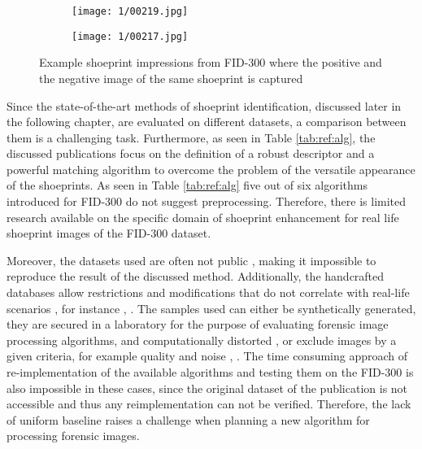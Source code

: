 \documentclass[draft,final]{vutinfth} %
\begin{document}
\begin{figure}[H]
  \centering
  \begin{subfigure}[t]{0.38\columnwidth}
    \centering
    \texttt{[image: 1/00219.jpg]}
	\caption{}
	\label{fig:int:cap:pos}
  \end{subfigure}
  \begin{subfigure}[t]{0.38\columnwidth}
    \centering
    \texttt{[image: 1/00217.jpg]}
	\caption{}
	\label{fig:int:cap:neg}
  \end{subfigure}
  \caption{Example shoeprint impressions from FID-300 where the positive  and the negative  image of the same shoeprint is captured}
  \label{fig:int:cap}
\end{figure}


\par
Since the state-of-the-art methods of shoeprint identification, discussed later in the following chapter, are evaluated on different datasets, a comparison between them is a challenging task.
Furthermore, as seen in Table \ref{tab:ref:alg}, the discussed publications focus on the definition of a robust descriptor and a powerful matching algorithm to overcome the problem of the versatile appearance of the shoeprints.
As seen in Table \ref{tab:ref:alg} five out of six algorithms introduced for FID-300 do not suggest preprocessing.
Therefore, there  is limited research available on the specific domain of shoeprint enhancement for real life shoeprint images of the FID-300 dataset. 
\par
Moreover, the datasets used are often not public \cite{katireddy2017novel}, \cite{dardi2009texture} making it impossible to reproduce the result of the discussed method.
Additionally, the handcrafted databases allow restrictions and modifications that do not correlate with real-life scenarios \cite{rida2019forensic}, for instance \cite{dardi2009texture}, \cite{tang2010footwear}.
The samples used can either be synthetically generated, they are secured in a laboratory for the purpose of evaluating forensic image processing algorithms, and computationally distorted \cite{de2005automated}, \cite{gueham2008automatic} or exclude images by a given criteria, for example quality and noise \cite{dardi2009texture}, \cite{tang2010footwear}.
The time consuming approach of re-implementation of the available algorithms and testing them on the FID-300 is also impossible in these cases, since the original dataset of the publication is not accessible and thus any reimplementation can not be verified.
Therefore, the lack of uniform baseline raises a challenge when planning a new algorithm for processing forensic images.
\end{document}
